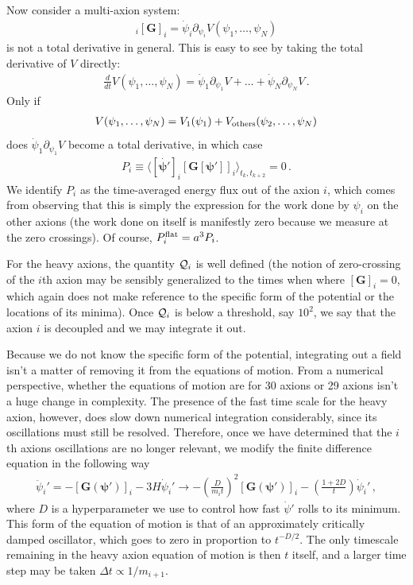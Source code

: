 \documentclass{article}
\begin{document}
Now consider a multi-axion system:
\begin{align}
    [\dot{\bm\psi}]_i[\bm G]_i = \dot \psi_i\partial_{\psi_i}V(\psi_1,\dots,\psi_N)
\end{align}
is not a total derivative in general. This is easy to see by taking the total derivative of $V$ directly:
\begin{align}
    \frac{d}{dt}V(\psi_1,\dots,\psi_N) = \dot\psi_1\partial_{\psi_1}V + \dots+\dot\psi_N\partial_{\psi_N}V\,.
\end{align}
Only if
\begin{align}
    V(\psi_1,\dots,\psi_N) = V_1(\psi_1) + V_{\rm others}(\psi_2,\dots,\psi_N)
\end{align}
does $\dot\psi_1\partial_{\psi_1}V$ become a total derivative, in which case
\begin{align}
    P_i\equiv \langle[\dot{\bm \psi'}]_i [\bm G[\bm\psi']]_i\rangle_{t_k,t_{k + 2}} = 0\,.
\end{align}
We identify $P_i$ as the time-averaged energy flux out of the axion $i$, which comes from observing that this is simply the expression for the work done by $\psi_i$ on the other axions (the work done on itself is manifestly zero because we measure at the zero crossings). Of course, $P_i^{\rm flat} = a^3 P_i$.

For the heavy axions, the quantity ${\cal Q}_i$ is well defined (the notion of zero-crossing of the $i$th axion may be sensibly generalized to the times when where $[\bm G]_i = 0$, which again does not make reference to the specific form of the potential or the locations of its minima). Once ${\cal Q}_i$ is below a threshold, say $10^{2}$, we say that the axion $i$ is decoupled and we may integrate it out.

Because we do not know the specific form of the potential, integrating out a field isn't a matter of removing it from the equations of motion. From a numerical perspective, whether the equations of motion are for 30 axions or 29 axions isn't a huge change in complexity. The presence of the fast time scale for the heavy axion, however, does slow down numerical integration considerably, since its oscillations must still be resolved. Therefore, once we have determined that the $i$th axions oscillations are no longer relevant, we modify the finite difference equation in the following way
\begin{align}\label{eqn:critical_damping_modification}
    \ddot\psi_i' = -[\bm G(\bm\psi')]_i - 3 H\dot\psi_i'\to -\left(\frac{D}{m_it}\right)^2[\bm G(\bm\psi')]_i - \left(\frac{1 + 2 D}{t}\right)\dot\psi_i'\,,
\end{align}
where $D$ is a hyperparameter we use to control how fast $\dot\psi'$ rolls to its minimum. This form of the equation of motion is that of an approximately critically damped oscillator, which goes to zero in proportion to $t^{-D/2}$. The only timescale remaining in the heavy axion equation of motion is then $t$ itself, and a larger time step may be taken $\Delta t\propto 1/m_{i + 1}$.
\end{document}
